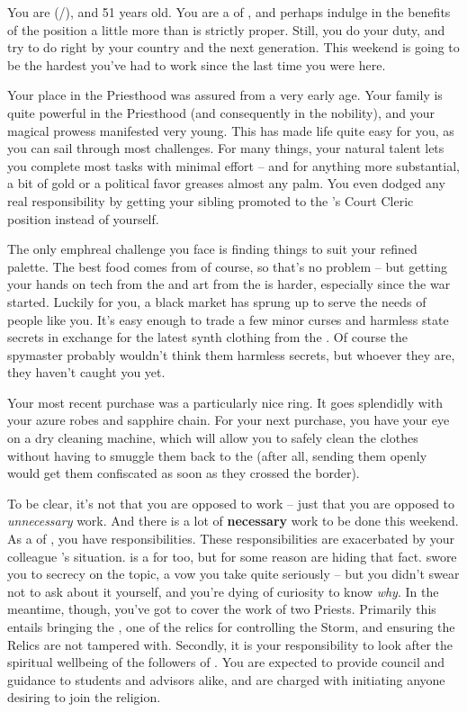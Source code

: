 \documentclass[char]{GL2020}
\begin{document}
\name{\cHedonist{}}

You are \cHedonist{} (\cHedonist{\they}/\cHedonist{\them}), and 51 years old. You are a \cHedonist{\cleric} of \cFarmGod{}, and perhaps indulge in the benefits of the position a little more than is strictly proper. Still, you do your duty, and try to do right by your country and the next generation. This weekend is going to be the hardest you’ve had to work since the last time you were here.

Your place in the Priesthood was assured from a very early age. Your family is quite powerful in the Priesthood (and consequently in the nobility), and your magical prowess manifested very young. This has made life quite easy for you, as you can sail through most challenges. For many things, your natural talent lets you complete most tasks with minimal effort -- and for anything more substantial, a bit of gold or a political favor greases almost any palm. You even dodged any real responsibility by getting your sibling promoted to the \cQueen{\Majesty}’s Court Cleric position instead of yourself.

The only emph{real} challenge you face is finding things to suit your refined palette. The best food comes from \pFarm{} of course, so that’s no problem -- but getting your hands on tech from the \pTech{} and art from the \pShip{} is harder, especially since the war started. Luckily for you, a black market has sprung up to serve the needs of people like you. It’s easy enough to trade a few minor curses and harmless state secrets in exchange for the latest synth clothing from the \pTech{}. Of course the \pFarm{} spymaster probably wouldn’t think them harmless secrets, but whoever they are, they haven’t caught you yet. 

Your most recent purchase was a particularly nice ring. It goes splendidly with your azure robes and sapphire chain. For your next purchase, you have your eye on a dry cleaning machine, which will allow you to safely clean the clothes without having to smuggle them back to the \pTech{} (after all, sending them openly would get them confiscated as soon as they crossed the border).

To be clear, it’s not that you are opposed to work -- just that you are opposed to \emph{unnecessary} work. And there is a lot of \textbf{necessary} work to be done this weekend. As a \cHedonist{\cleric} of \cFarmGod{}, you have responsibilities. These responsibilities are exacerbated by your colleague \cInterpol{}’s situation. \cInterpol{} is a \cInterpol{\cleric} for \cFarmGod{} too, but for some reason \cInterpol{\they} are hiding that fact. \cInterpol{\They} swore you to secrecy on the topic, a vow you take quite seriously -- but you didn’t swear not to ask about it yourself, and you’re dying of curiosity to know \emph{why}. In the meantime, though, you’ve got to cover the work of two Priests. Primarily this entails bringing the \iPitcher{}, one of the \pFarm{} relics for controlling the Storm, and ensuring the Relics are not tampered with. Secondly, it is your responsibility to look after the spiritual wellbeing of the followers of \cFarmGod{}. You are expected to provide council and guidance to students and advisors alike, and are charged with initiating anyone desiring to join the religion.
\end{document}
